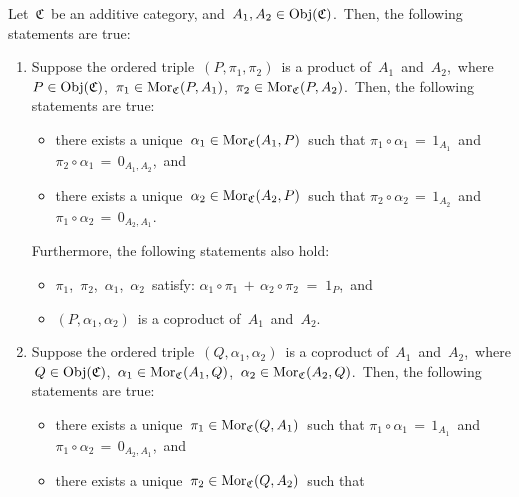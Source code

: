 \vskip 0.5cm
\begin{proposition}
\label{InAdditiveCategoryProductsCoproductsAreSame}
\mbox{}
\vskip 0.10cm
\noindent
Let \,$\mathfrak{C}$\, be an additive category, and \,$A_{1}, A_{2} \in \textnormal{Obj}(\mathfrak{C})$.\,
Then, the following statements are true:
\begin{enumerate}
\item
	Suppose the ordered triple \,$(P,\pi_{1},\pi_{2})$\, is a product of \,$A_{1}$\, and \,$A_{2}$,\,
	where \,$P \in \textnormal{Obj}(\mathfrak{C})$, \,$\pi_{1} \in \textnormal{Mor}_{\mathfrak{C}}(P,A_{1})$, \,$\pi_{2} \in \textnormal{Mor}_{\mathfrak{C}}(P,A_{2})$.\,
	Then, the following statements are true:
	\begin{itemize}
	\item
		there exists a unique
		\,$\alpha_{1} \in \textnormal{Mor}_{\mathfrak{C}}(A_{1},P)$\,
		such that
		\;$\pi_{1} \circ \alpha_{1} \,=\, 1_{A_{1}}$\, and \;$\pi_{2} \circ \alpha_{1} \,=\, 0_{A_{1},A_{2}}$,\, and
	\item
		there exists a unique
		\,$\alpha_{2} \in \textnormal{Mor}_{\mathfrak{C}}(A_{2},P)$\,
		such that
		\;$\pi_{2} \circ \alpha_{2} \,=\, 1_{A_{2}}$\, and \;$\pi_{1} \circ \alpha_{2} \,=\, 0_{A_{2},A_{1}}$.\,
	\end{itemize}
	Furthermore, the following statements also hold:
	\begin{itemize}
	\item
		$\pi_{1}$, \,$\pi_{2}$, \,$\alpha_{1}$, \,$\alpha_{2}$\, satisfy:
		\;$\alpha_{1} \circ \pi_{1} \,+\, \alpha_{2} \circ \pi_{2} \; = \; 1_{P}$,\, and
	\item
		$(P,\alpha_{1},\alpha_{2})$\, is a coproduct of \,$A_{1}$\, and \,$A_{2}$.\,
	\end{itemize}
\item
	Suppose the ordered triple \,$(Q,\alpha_{1},\alpha_{2})$\, is a coproduct of \,$A_{1}$\, and \,$A_{2}$,\,
	where
	\,$Q \in \textnormal{Obj}(\mathfrak{C})$,
	\,$\alpha_{1} \in \textnormal{Mor}_{\mathfrak{C}}(A_{1},Q)$,
	\,$\alpha_{2} \in \textnormal{Mor}_{\mathfrak{C}}(A_{2},Q)$.\,
	Then, the following statements are true:
	\begin{itemize}
	\item
		there exists a unique
		\,$\pi_{1} \in \textnormal{Mor}_{\mathfrak{C}}(Q,A_{1})$\,
		such that
		\;$\pi_{1} \circ \alpha_{1} \,=\, 1_{A_{1}}$\,
		and
		\;$\pi_{1} \circ \alpha_{2} \,=\, 0_{A_{2},A_{1}}$,\, and
	\item
		there exists a unique
		\,$\pi_{2} \in \textnormal{Mor}_{\mathfrak{C}}(Q,A_{2})$\,
		such that

\end{itemize}
\end{enumerate}
\end{proposition}
